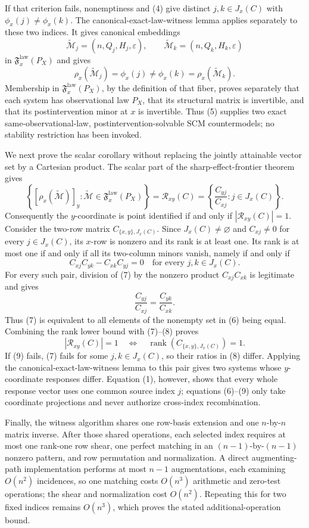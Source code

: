 If that criterion fails, nonemptiness and (4) give distinct \(j,k\in J_x(C)\) with \(\phi_x(j)\ne\phi_x(k)\). The canonical-exact-law-witness lemma applies separately to these two indices. It gives canonical embeddings
\[
 \widetilde{\mathcal M}_j=(n,Q_j,H_j,\varepsilon),
 \qquad
 \widetilde{\mathcal M}_k=(n,Q_k,H_k,\varepsilon)
\]
in \(\mathfrak F_x^{\mathrm{law}}(P_X)\) and gives
\[
 \rho_x(\widetilde{\mathcal M}_j)=\phi_x(j)\ne
 \phi_x(k)=\rho_x(\widetilde{\mathcal M}_k). \tag{5}
\]
Membership in \(\mathfrak F_x^{\mathrm{law}}(P_X)\), by the definition of that fiber, proves separately that each system has observational law \(P_X\), that its structural matrix is invertible, and that its postintervention minor at \(x\) is invertible. Thus (5) supplies two exact same-observational-law, postintervention-solvable SCM countermodels; no stability restriction has been invoked.

We next prove the scalar corollary without replacing the jointly attainable vector set by a Cartesian product. The scalar part of the sharp-effect-frontier theorem gives
\[
 \left\{[\rho_x(\widetilde{\mathcal M})]_y:
 \widetilde{\mathcal M}\in\mathfrak F_x^{\mathrm{law}}(P_X)\right\}
 =\mathcal R_{xy}(C)
 =\left\{\frac{C_{yj}}{C_{xj}}:j\in J_x(C)\right\}. \tag{6}
\]
Consequently the \(y\)-coordinate is point identified if and only if \(|\mathcal R_{xy}(C)|=1\). Consider the two-row matrix \(C_{\{x,y\},J_x(C)}\). Since \(J_x(C)\ne\varnothing\) and \(C_{xj}\ne0\) for every \(j\in J_x(C)\), its \(x\)-row is nonzero and its rank is at least one. Its rank is at most one if and only if all its two-column minors vanish, namely if and only if
\[
 C_{xj}C_{yk}-C_{xk}C_{yj}=0
 \quad\text{for every }j,k\in J_x(C). \tag{7}
\]
For every such pair, division of (7) by the nonzero product \(C_{xj}C_{xk}\) is legitimate and gives
\[
 \frac{C_{yj}}{C_{xj}}=\frac{C_{yk}}{C_{xk}}. \tag{8}
\]
Thus (7) is equivalent to all elements of the nonempty set in (6) being equal. Combining the rank lower bound with (7)--(8) proves
\[
 |\mathcal R_{xy}(C)|=1
 \quad\Longleftrightarrow\quad
 \operatorname{rank}\!\left(C_{\{x,y\},J_x(C)}\right)=1. \tag{9}
\]
If (9) fails, (7) fails for some \(j,k\in J_x(C)\), so their ratios in (8) differ. Applying the canonical-exact-law-witness lemma to this pair gives two systems whose \(y\)-coordinate responses differ. Equation (1), however, shows that every whole response vector uses one common source index \(j\); equations (6)--(9) only take coordinate projections and never authorize cross-index recombination.

Finally, the witness algorithm shares one row-basis extension and one \(n\)-by-\(n\) matrix inverse. After those shared operations, each selected index requires at most one rank-one row shear, one perfect matching in an \((n-1)\)-by-\((n-1)\) nonzero pattern, and row permutation and normalization. A direct augmenting-path implementation performs at most \(n-1\) augmentations, each examining \(O(n^2)\) incidences, so one matching costs \(O(n^3)\) arithmetic and zero-test operations; the shear and normalization cost \(O(n^2)\). Repeating this for two fixed indices remains \(O(n^3)\), which proves the stated additional-operation bound.
